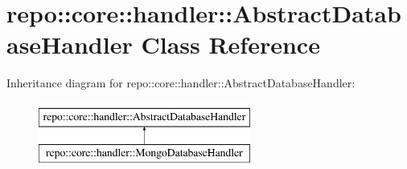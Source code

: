 \hypertarget{classrepo_1_1core_1_1handler_1_1_abstract_database_handler}{}\section{repo\+:\+:core\+:\+:handler\+:\+:Abstract\+Database\+Handler Class Reference}
\label{classrepo_1_1core_1_1handler_1_1_abstract_database_handler}
Inheritance diagram for repo\+:\+:core\+:\+:handler\+:\+:Abstract\+Database\+Handler\+:\begin{figure}[H]
\begin{center}
\leavevmode
\includegraphics[height=2.000000cm]{classrepo_1_1core_1_1handler_1_1_abstract_database_handler}
\end{center}
\end{figure}
